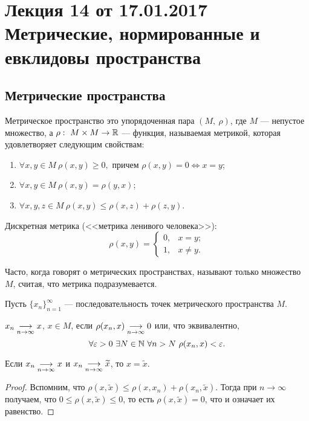 \section{Лекция 14 от 17.01.2017 \\ Метрические, нормированные и евклидовы пространства}

\subsection*{Метрические пространства}

\begin{Def}
Метрическое пространство это упорядоченная пара $(M,\ \rho)$, где $M$ --- непустое множество, а $\rho:\ M\times M \to \mathbb{R}$ --- функция, называемая метрикой, которая удовлетворяет следующим свойствам:
\begin{enumerate}
\item $\forall x, y \in M\ \rho(x, y) \geq 0,$ причем $\rho(x, y) = 0 \Leftrightarrow x = y$;
\item $\forall x, y \in M\ \rho(x, y) = \rho(y, x)$;
\item $\forall x, y, z \in M\ \rho(x, y) \leq \rho(x, z) + \rho(z, y)$.
\end{enumerate}
\end{Def}

\begin{Examples}
Дискретная метрика (<<метрика ленивого человека>>):
$$
\rho(x, y) = \begin{cases}
0, & x = y;\\
1, & x \neq y.
\end{cases}
$$
\end{Examples}

Часто, когда говорят о метрических пространствах, называют только множество $M$, считая, что метрика подразумевается.

Пусть $\{x_n\}_{n=1}^{\infty}$ --- последовательность точек метрического пространства $M$.
\begin{Def}
$x_n \underset{n\to \infty}{\longrightarrow} x $, $x\in M$, если $\rho(x_n, x) \underset{n\to \infty}{\longrightarrow} 0$ или, что эквивалентно,
$$
\forall \varepsilon > 0\ \exists N \in \mathbb{N}\ \forall n > N\ \rho(x_n, x) < \varepsilon.
$$
\end{Def}

\begin{Statement}
Если $x_n \underset{n\to \infty}{\longrightarrow} x$ и $x_n \underset{n\to \infty}{\longrightarrow} \widetilde{x}$, то $x = \widetilde{x}$.
\end{Statement}
\begin{proof}
Вспомним, что $\rho(x, \widetilde{x}) \leq \rho(x, x_n) + \rho(x_n, \widetilde{x})$. Тогда при $n \to \infty$ получаем, что $0 \leq \rho(x, \widetilde{x}) \leq 0$, то есть $\rho(x, \widetilde{x}) = 0$, что и означает их равенство. 
\end{proof}

